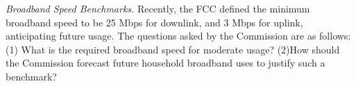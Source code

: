  \emph{Broadband Speed Benchmarks.} Recently, the FCC defined the minimum broadband speed to be 25 Mbps for downlink, and 3 Mbps for uplink, anticipating future usage. The questions asked by the Commission are as follows: (1) What is the required broadband speed for moderate usage? (2)How should the Commission forecast future household broadband uses to justify such a benchmark?


